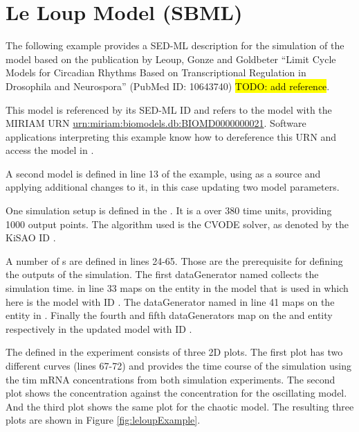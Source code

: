 \section{Le Loup Model (SBML)}
The following example provides a SED-ML description for the simulation of the model based on the publication by Leoup, Gonze and Goldbeter ``Limit Cycle Models for Circadian Rhythms Based on Transcriptional Regulation in Drosophila and Neurospora'' (PubMed ID: 10643740) \hl{TODO: add reference}.

This model is referenced by its SED-ML ID   and refers to the model with the MIRIAM URN \url{urn:miriam:biomodels.db:BIOMD0000000021}. 
Software applications interpreting this example know how to dereference this URN and access the model in \biom \citep{N+06}.

A second model is defined in line 13 of the example, using  as a source and applying additional changes to it, in this case updating two model parameters.

One simulation setup is defined in the . It is a  over 380 time units, providing 1000 output points. The algorithm used is the CVODE solver, as denoted by the KiSAO ID .

A number of s are defined in lines 24-65. Those are the prerequisite for defining the outputs of the simulation. The first dataGenerator named  collects the simulation time.  in line 33 maps on the  entity in the model that is used in  which here is the model with ID . The dataGenerator named  in line 41 maps on the  entity in . Finally  the fourth and fifth dataGenerators map on the  and  entity respectively in the updated model with ID .

The  defined in the experiment consists of three 2D plots. The first plot has two different curves (lines 67-72) and provides the time course of the simulation using the tim mRNA concentrations from both simulation experiments. The second plot shows the  concentration against the  concentration for the oscillating model. And the third plot shows the same plot for the chaotic model. The resulting three plots are shown in Figure \ref{fig:leloupExample}. 



